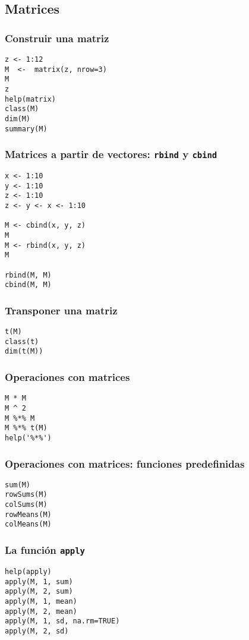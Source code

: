 \documentclass{beamer}
\begin{document}
\subsection{Matrices}
\label{sec-1-2}
\begin{frame}[fragile]
\frametitle{Construir una matriz}
\label{sec-1-2-1}


\lstset{language=R}
\begin{lstlisting}
z <- 1:12
M  <-  matrix(z, nrow=3)
M
z
help(matrix)
class(M)
dim(M)
summary(M)
\end{lstlisting}
\end{frame}
\begin{frame}[fragile]
\frametitle{Matrices a partir de vectores: \texttt{rbind} y \texttt{cbind}}
\label{sec-1-2-2}


\lstset{language=R}
\begin{lstlisting}
x <- 1:10
y <- 1:10
z <- 1:10
z <- y <- x <- 1:10

M <- cbind(x, y, z)
M
M <- rbind(x, y, z)
M

rbind(M, M)
cbind(M, M)
\end{lstlisting}
\end{frame}
\begin{frame}[fragile]
\frametitle{Transponer una matriz}
\label{sec-1-2-3}



\lstset{language=R}
\begin{lstlisting}
t(M)
class(t)
dim(t(M))
\end{lstlisting}
\end{frame}
\begin{frame}[fragile]
\frametitle{Operaciones con matrices}
\label{sec-1-2-4}



\lstset{language=R}
\begin{lstlisting}
M * M
M ^ 2
M %*% M
M %*% t(M)
help('%*%')
\end{lstlisting}
\end{frame}
\begin{frame}[fragile]
\frametitle{Operaciones con matrices: funciones predefinidas}
\label{sec-1-2-5}



\lstset{language=R}
\begin{lstlisting}
sum(M)
rowSums(M)
colSums(M)
rowMeans(M)
colMeans(M)
\end{lstlisting}
\end{frame}
\begin{frame}[fragile]
\frametitle{La función \texttt{apply}}
\label{sec-1-2-6}


\lstset{language=R}
\begin{lstlisting}
help(apply)
apply(M, 1, sum)
apply(M, 2, sum)
apply(M, 1, mean)
apply(M, 2, mean)
apply(M, 1, sd, na.rm=TRUE)
apply(M, 2, sd)
\end{lstlisting}
\end{frame}
\end{document}
